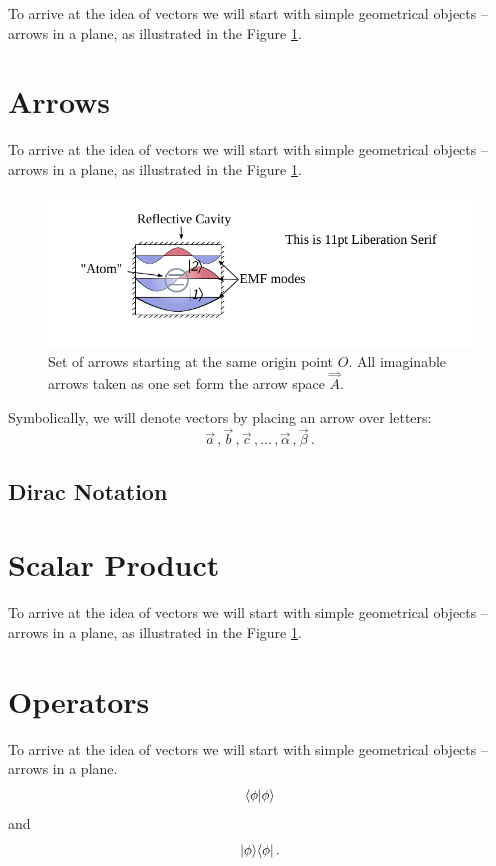 To arrive at the idea of vectors we will start with simple geometrical
objects -- arrows in a plane, as illustrated in the Figure \ref{fig:arrowsSpace}.


\section{Arrows}

To arrive at the idea of vectors we will start with simple geometrical
objects -- arrows in a plane, as illustrated in the Figure \ref{fig:arrowsSpace}.

\begin{figure}[htbp]
  \centering
  \includegraphics[scale=1.0]{defaultFigureTemplate}
  \caption{Set of arrows starting at the same origin point $O$. All
    imaginable arrows taken as one set form the arrow space
    $\overset{\Rightarrow}{A}$.}
  \label{fig:arrowsSpace}
\end{figure}

Symbolically, we will denote vectors by placing an arrow over letters:
\[
\vec{a}\,,\vec{b}\,,\vec{c}\,,\ldots\,,\vec{\alpha}\,,\vec{\beta}\,.
\]

\subsection{Dirac Notation}

\section{Scalar Product}

To arrive at the idea of vectors we will start with simple geometrical
objects -- arrows in a plane, as illustrated in the Figure \ref{fig:arrowsSpace}.


\section{Operators}

To arrive at the idea of vectors we will start with simple geometrical
objects -- arrows in a plane.
\[
\langle{\phi}|{\phi\rangle}
\]
and
\[
|{\phi}\rangle\langle{\phi}|\,.
\]

